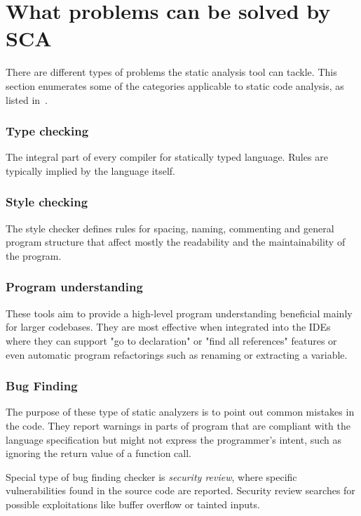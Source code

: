 \documentclass[
  digital, %
  table,   %
  lof,     %
  lot,     %
  oneside,
]{fithesis3}
\begin{document}
\section{What problems can be solved by SCA}
There are different types of problems the static analysis tool can tackle. This section enumerates some of the categories applicable to static code analysis, as listed in~\cite{secure-programming-sca}.

\subsubsection{Type checking}
The integral part of every compiler for statically typed language. Rules are typically implied by the language itself.

\subsubsection{Style checking}
The style checker defines rules for spacing, naming, commenting and general program structure that affect mostly the readability and the maintainability of the program. 

\subsubsection{Program understanding}
These tools aim to provide a high-level program understanding beneficial mainly for larger codebases. They are most effective when integrated into the IDEs where they can support "go to declaration" or "find all references" features or even automatic program refactorings such as renaming or extracting a variable.

\subsubsection{Bug Finding}
The  purpose of these type of static analyzers is to point out common mistakes in the code. They report warnings in parts of program that are compliant with the language specification but might not express the programmer's intent, such as ignoring the return value of a function call.

Special type of bug finding checker is \textit{security review}, where specific vulnerabilities found in the source code are reported. Security review searches for possible exploitations like buffer overflow or tainted inputs.
  
\end{document}
